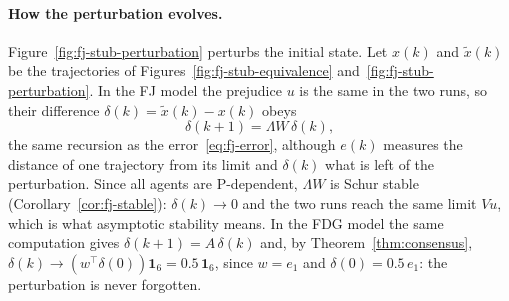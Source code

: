 \paragraph{How the perturbation evolves.}
Figure~\ref{fig:fj-stub-perturbation} perturbs the initial state. Let $x(k)$ and
$\tilde x(k)$ be the trajectories of Figures~\ref{fig:fj-stub-equivalence}
and~\ref{fig:fj-stub-perturbation}. In the FJ model the prejudice $u$ is the same in the
two runs, so their difference $\delta(k) = \tilde x(k) - x(k)$ obeys
\[
  \delta(k+1) = \Lambda W\, \delta(k),
\]
the same recursion as the error~\eqref{eq:fj-error}, although $e(k)$ measures the
distance of one trajectory from its limit and $\delta(k)$ what is left of the
perturbation. Since all agents are P-dependent, $\Lambda W$ is Schur stable
(Corollary~\ref{cor:fj-stable}): $\delta(k) \to 0$ and the two runs reach the same limit
$Vu$, which is what asymptotic stability means. In the FDG model the same computation
gives $\delta(k+1) = A\,\delta(k)$ and, by Theorem~\ref{thm:consensus},
$\delta(k) \to (w^\top \delta(0))\mathbf{1}_6 = 0.5\,\mathbf{1}_6$, since $w = e_1$ and
$\delta(0) = 0.5\, e_1$: the perturbation is
never forgotten.

